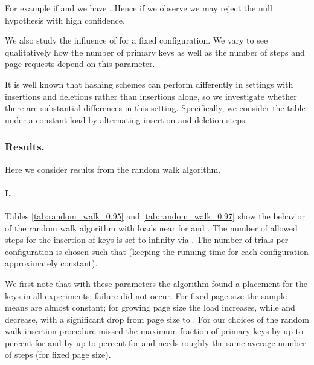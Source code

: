\let\accentvec\vec \documentclass{llncs}
\begin{document}
For example if  and  we have . 
Hence if we observe  we may reject the null hypothesis with high confidence.

We also study the influence of  for a fixed configuration.
We vary  to see qualitatively how the number of primary
keys as well as the number of steps and page requests depend on this
parameter.

It is well known that hashing schemes can perform differently in
settings with insertions and deletions rather than insertions alone,
so we investigate whether there are substantial differences in this
setting.  Specifically, we consider the table under a constant load by
alternating insertion and deletion steps.

\subsubsection{Results.}  Here we consider results from the random walk algorithm.
\paragraph{I.} Tables \ref{tab:random_walk_0.95} and \ref{tab:random_walk_0.97} show the behavior of the random walk algorithm with loads near  for  and . The number of allowed steps for the insertion of  keys is set to infinity via . The number of trials  per configuration is chosen such that  (keeping the running time for each configuration approximately constant).

We first note that with these parameters the algorithm found a placement for the keys in all experiments; failure did not occur.  For fixed page size the sample means are almost constant; for growing page size the load  increases, while  and  decrease, with a significant drop from page size  to .
For our choices of  the random walk insertion procedure missed the maximum fraction of primary keys by up to  percent for  and by up to  percent for  and needs roughly the same average number of steps (for fixed page size).
\end{document}
